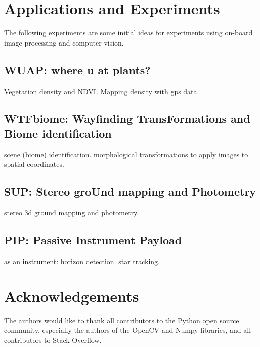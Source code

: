 \documentclass[conference]{IEEEtran} %
\begin{document}
\section{Applications and Experiments}
\label{sec:payloads}
The following experiments are some initial ideas for experiments using on-board image processing and computer vision.

\subsection{WUAP: where u at plants?}
\label{subsec:wuap}
Vegetation density and NDVI. Mapping density with gps data.

\subsection{WTFbiome: Wayfinding TransFormations and Biome identification}
\label{subsec:wtfbiome}
scene (biome) identification.
morphological transformations to apply images to spatial coordinates.

\subsection{SUP: Stereo groUnd mapping and Photometry}
\label{subsec:sup}
stereo 3d ground mapping and photometry.

\subsection{PIP: Passive Instrument Payload}
\label{subsec:pip}
as an instrument: horizon detection. star tracking.

\section*{Acknowledgements}
The authors would like to thank all contributors to the Python open source community, especially the authors of the OpenCV and Numpy libraries, and all contributors to Stack Overflow.




\onecolumn
\appendices{}
\end{document}
